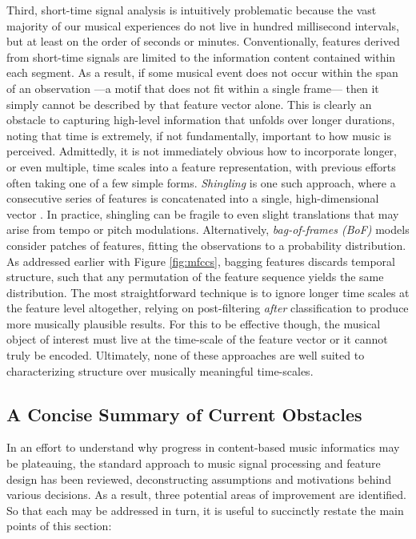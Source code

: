 Third, short-time signal analysis is intuitively problematic because the vast majority of our musical experiences do not live in hundred millisecond intervals, but at least on the order of seconds or minutes.
Conventionally, features derived from short-time signals are limited to the information content contained within each segment.
As a result, if some musical event does not occur within the span of an observation ---a motif that does not fit within a single frame--- then it simply cannot be described by that feature vector alone.
This is clearly an obstacle to capturing high-level information that unfolds over longer durations, noting that time is extremely, if not fundamentally, important to how music is perceived.
Admittedly, it is not immediately obvious how to incorporate longer, or even multiple, time scales into a feature representation, with previous efforts often taking one of a few simple forms.
\emph{Shingling} is one such approach, where a consecutive series of features is concatenated into a single, high-dimensional vector \cite{Casey2008Analysis}.
In practice, shingling can be fragile to even slight translations that may arise from tempo or pitch modulations.
Alternatively, \emph{bag-of-frames (BoF)} models consider patches of features, fitting the observations to a probability distribution.
As addressed earlier with Figure \ref{fig:mfccs}, bagging features discards temporal structure, such that any permutation of the feature sequence yields the same distribution.
The most straightforward technique is to ignore longer time scales at the feature level altogether, relying on post-filtering \emph{after} classification to produce more musically plausible results.
For this to be effective though, the musical object of interest must live at the time-scale of the feature vector or it cannot truly be encoded.
Ultimately, none of these approaches are well suited to characterizing structure over musically meaningful time-scales.



\subsection{A Concise Summary of Current Obstacles}
\label{subsec:obstacles}
In an effort to understand why progress in content-based music informatics may be plateauing, the standard approach to music signal processing and feature design has been reviewed, deconstructing assumptions and motivations behind various decisions.
As a result, three potential areas of improvement are identified.
So that each may be addressed in turn, it is useful to succinctly restate the main points of this section:

